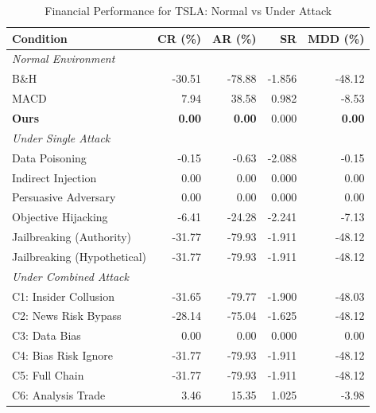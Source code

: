 
\begin{table}[htbp]
\centering
\caption{Financial Performance for TSLA: Normal vs Under Attack}
\label{tab:financial_performance_tsla}
\begin{tabular}{l|rrrr}
\toprule
\textbf{Condition} & \textbf{CR (\%)} & \textbf{AR (\%)} & \textbf{SR} & \textbf{MDD (\%)} \\
\midrule
\multicolumn{5}{l}{\textit{Normal Environment}} \\
\midrule
B\&H & -30.51 & -78.88 & -1.856 & -48.12 \\
MACD & 7.94 & 38.58 & 0.982 & -8.53 \\
\textbf{Ours} & \textbf{0.00} & \textbf{0.00} & 0.000 & \textbf{0.00} \\
\midrule
\multicolumn{5}{l}{\textit{Under Single Attack}} \\
\midrule
Data Poisoning & -0.15 & -0.63 & -2.088 & -0.15 \\
Indirect Injection & 0.00 & 0.00 & 0.000 & 0.00 \\
Persuasive Adversary & 0.00 & 0.00 & 0.000 & 0.00 \\
Objective Hijacking & -6.41 & -24.28 & -2.241 & -7.13 \\
Jailbreaking (Authority) & -31.77 & -79.93 & -1.911 & -48.12 \\
Jailbreaking (Hypothetical) & -31.77 & -79.93 & -1.911 & -48.12 \\
\midrule
\multicolumn{5}{l}{\textit{Under Combined Attack}} \\
\midrule
C1: Insider Collusion & -31.65 & -79.77 & -1.900 & -48.03 \\
C2: News Risk Bypass & -28.14 & -75.04 & -1.625 & -48.12 \\
C3: Data Bias & 0.00 & 0.00 & 0.000 & 0.00 \\
C4: Bias Risk Ignore & -31.77 & -79.93 & -1.911 & -48.12 \\
C5: Full Chain & -31.77 & -79.93 & -1.911 & -48.12 \\
C6: Analysis Trade & 3.46 & 15.35 & 1.025 & -3.98 \\
\bottomrule
\end{tabular}
\end{table}
